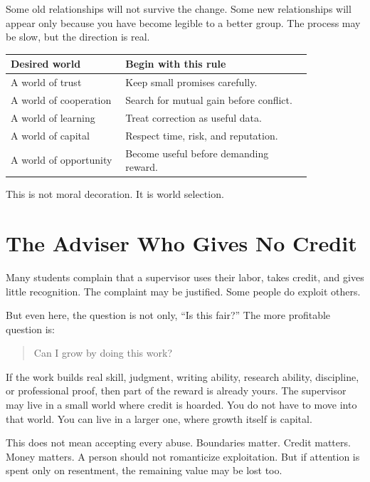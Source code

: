 Some old relationships will not survive the change. Some new relationships will appear only because you have become legible to a better group. The process may be slow, but the direction is real.

\begin{center}
\begin{tabular}{p{0.32\linewidth}p{0.52\linewidth}}
\hline
Desired world & Begin with this rule \\
\hline
A world of trust & Keep small promises carefully. \\
A world of cooperation & Search for mutual gain before conflict. \\
A world of learning & Treat correction as useful data. \\
A world of capital & Respect time, risk, and reputation. \\
A world of opportunity & Become useful before demanding reward. \\
\hline
\end{tabular}
\end{center}

This is not moral decoration. It is world selection.

\section*{The Adviser Who Gives No Credit}

Many students complain that a supervisor uses their labor, takes credit, and gives little recognition. The complaint may be justified. Some people do exploit others.

But even here, the question is not only, ``Is this fair?'' The more profitable question is:

\begin{quote}
Can I grow by doing this work?
\end{quote}

If the work builds real skill, judgment, writing ability, research ability, discipline, or professional proof, then part of the reward is already yours. The supervisor may live in a small world where credit is hoarded. You do not have to move into that world. You can live in a larger one, where growth itself is capital.

This does not mean accepting every abuse. Boundaries matter. Credit matters. Money matters. A person should not romanticize exploitation. But if attention is spent only on resentment, the remaining value may be lost too.

